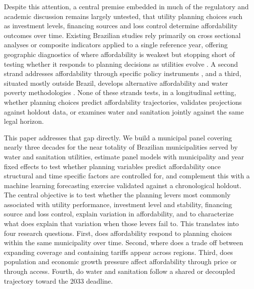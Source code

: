 \documentclass[preprint,12pt]{elsarticle}
\begin{document}
Despite this attention, a central premise embedded in much of the regulatory and academic discussion remains largely untested, that utility planning choices such as investment levels, financing sources and loss control determine affordability outcomes over time. Existing Brazilian studies rely primarily on cross sectional analyses or composite indicators applied to a single reference year, offering geographic diagnostics of where affordability is weakest but stopping short of testing whether it responds to planning decisions as utilities evolve \citep{Fagundes2025b,Fagundes2025a}. A second strand addresses affordability through specific policy instruments \citep{Fagundes2025a,Fagundes2024,Amorim2025,Fraga2025,Torio2025,Wichman2025,Patterson2023,Skerker2024,Moreira2025,Correa2026,Lopes2024,Mendes2026,LimaeSilva2026}, and a third, situated mostly outside Brazil, develops alternative affordability and water poverty methodologies \citep{MocholiArce2024,RomeroGomez2024,Nongbri2025,Wanguba2024,Belhadj2026}. None of these strands tests, in a longitudinal setting, whether planning choices predict affordability trajectories, validates projections against holdout data, or examines water and sanitation jointly against the same legal horizon.

This paper addresses that gap directly. We build a municipal panel covering nearly three decades for the near totality of Brazilian municipalities served by water and sanitation utilities, estimate panel models with municipality and year fixed effects to test whether planning variables predict affordability once structural and time specific factors are controlled for, and complement this with a machine learning forecasting exercise validated against a chronological holdout. The central objective is to test whether the planning levers most commonly associated with utility performance, investment level and stability, financing source and loss control, explain variation in affordability, and to characterize what does explain that variation when those levers fail to. This translates into four research questions. First, does affordability respond to planning choices within the same municipality over time. Second, where does a trade off between expanding coverage and containing tariffs appear across regions. Third, does population and economic growth pressure affect affordability through price or through access. Fourth, do water and sanitation follow a shared or decoupled trajectory toward the 2033 deadline.
\end{document}
